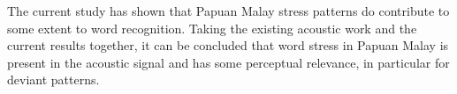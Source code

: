 The current study has shown that Papuan Malay stress patterns do contribute to some extent to word recognition. Taking the existing acoustic work and the current results together, it can be concluded that word stress in Papuan Malay is present in the acoustic signal and has some perceptual relevance, in particular for deviant patterns.
